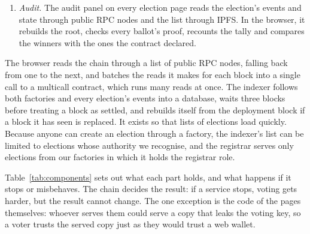 \begin{enumerate}
        depth, checks each against its pinned SHA-256 hash and builds the proof
        in a Web Worker, which keeps the page responsive. It then sends the
        choice, the nullifier and the proof to the relayer. The relayer checks
        that the election is an anonymous election from our factory, that
        voting is open, that the proof verifies, that the nullifier is unused
        and not already queued, and that the exact call succeeds in
        simulation. Only then does it sign a receipt and queue the ballot. It
        sends \texttt{castVote} to the election itself, and the booth waits
        until the nullifier appears on-chain. Any wallet can submit the same
        ballot instead.
  \item \emph{Audit.} The audit panel on every election page reads the
        election's events and state through public RPC nodes and the list
        through IPFS. In the browser, it rebuilds the root, checks every
        ballot's proof, recounts the tally and compares the winners with the
        ones the contract declared.
\end{enumerate}

The browser reads the chain through a list of public RPC nodes, falling back
from one to the next, and batches the reads it makes for each block into a
single call to a multicall contract, which runs many reads at once. The
indexer follows both factories and every election's events into a database,
waits three blocks before treating a block as settled, and rebuilds itself
from the deployment block if a block it has seen is replaced. It exists so
that lists of elections load quickly. Because anyone can create an election
through a factory, the indexer's list can be limited to elections whose
authority we recognise, and the registrar serves only elections from our
factories in which it holds the registrar role.

Table~\ref{tab:components} sets out what each part holds, and what happens if
it stops or misbehaves. The chain decides the result: if a service stops,
voting gets harder, but the result cannot change. The one exception is the
code of the pages themselves: whoever
serves them could serve a copy that leaks the voting key, so a voter trusts
the served copy just as they would trust a web wallet.

